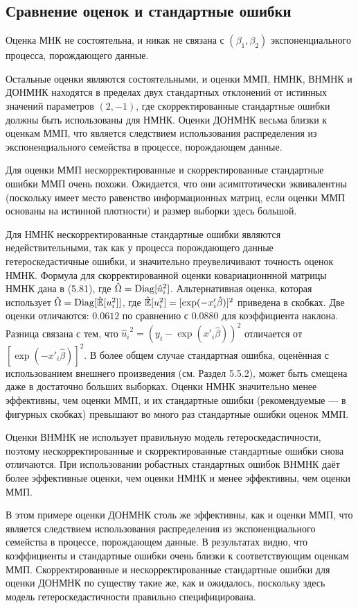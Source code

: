 \subsection{Сравнение оценок и стандартные ошибки}

Оценка МНК не состоятельна, и никак не связана с $(\beta_1,\beta_2)$  экспоненциального процесса, порождающего данные.

Остальные оценки являются состоятельными, и оценки ММП, НМНК, ВНМНК и ДОНМНК находятся в пределах двух стандартных отклонений от истинных значений параметров $(2,-1)$, где скорректированные стандартные ошибки должны быть использованы для НМНК. Оценки ДОНМНК весьма близки к оценкам ММП, что является следствием использования распределения из экспоненциального семейства в процессе, порождающем данные.

Для оценки ММП нескорректированные и скорректированные стандартные ошибки ММП очень похожи. Ожидается, что они асимптотически эквивалентны (поскольку имеет место равенство информационных матриц, если оценки ММП основаны на истинной плотности) и размер выборки здесь большой.

Для НМНК нескорректированные стандартные ошибки являются недействительными, так как у процесса порождающего данные гетероскедастичные ошибки, и значительно преувеличивают точность оценок НМНК. Формула для скорректированной оценки ковариационнной матрицы НМНК дана в (5.81), где $\hat{\Omega}=\mathrm{Diag}[{\hat{u}_i}^2]$. Альтернативная оценка, которая использует $\hat{\Omega}=\mathrm{Diag}[\hat{\mathbb{E}}[{u}_i^2]]$, где $\hat{\mathbb{E}}[{u}_i^2]=[\exp(-x'_i\hat{\beta})]^2$ приведена в скобках. 
Две оценки отличаются: $0.0612$ по сравнению с $0.0880$ для коэффициента наклона. Разница связана с тем, что ${\hat{u}_i}^2=(y_i-\exp(x'_i \hat{\beta}))^2$ отличается от $[\exp(-x'_i \hat{\beta})]^2$. В более общем случае стандартная ошибка, оценённая с использованием внешнего произведения (см. Раздел 5.5.2), может быть смещена даже в достаточно больших выборках. Оценки НМНК значительно менее эффективны, чем оценки ММП, и их стандартные ошибки (рекомендуемые --- в фигурных скобках) превышают во много раз стандартные ошибки оценок ММП.

Оценки ВНМНК не использует правильную модель гетероскедастичности, поэтому нескорректированные и скорректированные стандартные ошибки снова отличаются. При использовании робастных стандартных ошибок  ВНМНК даёт более эффективные оценки, чем оценки НМНК и менее эффективны, чем оценки ММП.

В этом примере оценки ДОНМНК столь же эффективны, как и оценки ММП, что является следствием использования распределения из экспоненциального семейства в процессе, порождающем данные. В результатах видно, что коэффициенты и стандартные ошибки очень близки к соответствующим оценкам ММП. Скорректированные и нескорректированные  стандартные ошибки для оценки ДОНМНК по существу такие же, как и ожидалось, поскольку здесь модель гетероскедастичности правильно специфицирована.

